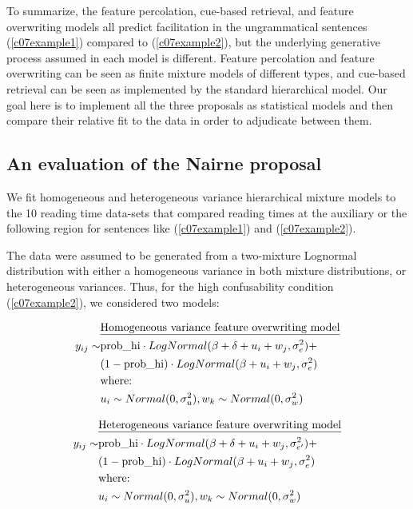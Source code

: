 \documentclass{cambridge7A}\usepackage[]{graphicx}\usepackage[]{color}
\begin{document}
To summarize, the feature percolation, cue-based retrieval, and 
feature overwriting models all predict facilitation in the ungrammatical sentences (\ref{c07example1}) compared to (\ref{c07example2}), but the underlying generative process assumed in each model is different.  Feature percolation and  feature overwriting can be seen as finite mixture models of different types, and cue-based retrieval can be seen as implemented by the standard hierarchical model.
Our goal here is to implement all the three proposals as statistical models and then compare their relative fit to the data in order to adjudicate between them.


\subsection{An evaluation of the Nairne proposal}

We fit homogeneous and heterogeneous variance hierarchical mixture models to the 10 reading time data-sets that compared reading times at the auxiliary or the following region for sentences like (\ref{c07example1}) and (\ref{c07example2}). 

The data were assumed to be generated from a two-mixture Lognormal distribution with either a homogeneous variance in both mixture distributions, or heterogeneous variances. 
Thus, for the high confusability condition (\ref{c07example2}), we considered two models:

\begin{equation}
\begin{split}
       ~&\hbox{\underline{Homogeneous variance feature overwriting model}}\\
y_{ij} \sim& \hbox{prob\_hi} \cdot LogNormal(\beta+\delta+u_i+w_j,\sigma_{e}^2)+\\
           ~& (1-\hbox{prob\_hi}) \cdot LogNormal(\beta+u_i+w_j,\sigma_e^2)\\
           ~& \hbox{where: }\\
           ~& u_i \sim Normal(0,\sigma_u^2), w_k \sim Normal(0,\sigma_w^2)\\ 
\end{split}
\end{equation}


\begin{equation}
\begin{split}
       ~&\hbox{\underline{Heterogeneous variance feature overwriting model}}\\
y_{ij}
\sim& \hbox{prob\_hi} \cdot LogNormal(\beta+\delta+u_i+w_j,\sigma_{e'}^2)+\\
           ~& (1-\hbox{prob\_hi}) \cdot LogNormal(\beta+u_i+w_j,\sigma_e^2)\\
           ~& \hbox{where: }\\
           ~& u_i \sim Normal(0,\sigma_u^2), w_k \sim Normal(0,\sigma_w^2)\\ 
\end{split}
\end{equation}
\end{document}
